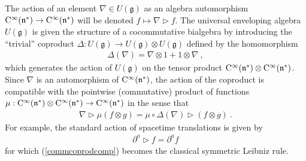\documentclass[11pt,a4paper]{article}
\newcommand{\1}{\mathbb{1}}
\def\CC{{\rm C}}
\def\mfn{{\mathfrak n}}
\def\mfg{{\mathfrak g}}
\newcommand{\beq}{\begin{eqnarray}}
\newcommand{\eeq}{\end{eqnarray}}
\begin{document}
The action of an element $\nabla\in U(\mfg)$ as an algebra
automorphism $\CC^\infty(\mfn^*)\to\CC^\infty(\mfn^*)$ will be denoted
$f\mapsto\nabla\triangleright f$. The universal enveloping algebra
$U(\mfg)$ is given the structure of a cocommutative bialgebra by
introducing the ``trivial'' coproduct $\Delta:U(\mfg)\to
U(\mfg)\otimes U(\mfg)$ defined by the homomorphism
\beq
\Delta(\nabla)=\nabla\otimes1+1\otimes\nabla \ ,
\label{trivialcoprod}\eeq
which generates the action of $U(\mfg)$ on the tensor product
$\CC^\infty(\mfn^*)\otimes\CC^\infty(\mfn^*)$. Since $\nabla$ is an
automorphism of $\CC^\infty(\mfn^*)$, the  action of the coproduct is
compatible with the pointwise (commutative) product of functions
$\mu:\CC^\infty(\mfn^*)\otimes\CC^\infty(\mfn^*)\to\CC^\infty(\mfn^*)$
in the sense that
\beq
\nabla\triangleright\mu(f\otimes g)=\mu\circ\Delta(\nabla)
\triangleright(f\otimes g) \ .
\label{commcoprodcomp}\eeq
For example, the standard action of spacetime translations is given by
\beq
\partial^a\triangleright f=\partial^af
\label{commtranslaction}\eeq
for which (\ref{commcoprodcomp}) becomes the classical symmetric
Leibniz rule.
\end{document}
